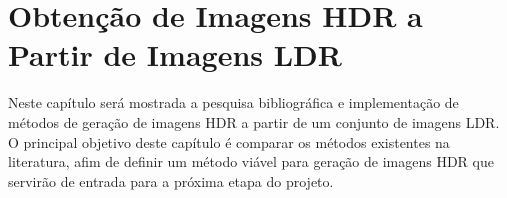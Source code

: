 \chapter{Obtenção de Imagens HDR a Partir de Imagens LDR} \label{metodos}
Neste capítulo será mostrada a pesquisa bibliográfica e implementação de métodos de geração de imagens HDR a partir de um conjunto de imagens LDR. O principal objetivo deste capítulo é comparar os métodos existentes na literatura, afim de definir um método viável para geração de imagens HDR que servirão de entrada para a próxima etapa do projeto.
